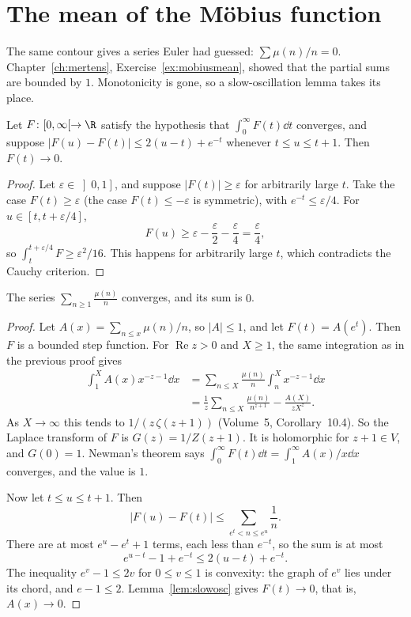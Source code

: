 \section{The mean of the Möbius function}

The same contour gives a series Euler had guessed: $\sum\mu(n)/n=0$. Chapter~\ref{ch:mertens}, Exercise~\ref{ex:mobiusmean}, showed that the partial sums are bounded by $1$. Monotonicity is gone, so a slow-oscillation lemma takes its place.

\begin{lemma}\label{lem:slowosc}
Let $F\colon[0,\infty[\to\R$ satisfy the hypothesis that $\int_0^\infty F(t)\dd t$ converges, and suppose $|F(u)-F(t)|\le2(u-t)+e^{-t}$ whenever $t\le u\le t+1$. Then $F(t)\to0$.
\end{lemma}
\begin{proof}
Let $\varepsilon\in\left]0,1\right]$, and suppose $|F(t)|\ge\varepsilon$ for arbitrarily large $t$. Take the case $F(t)\ge\varepsilon$ (the case $F(t)\le-\varepsilon$ is symmetric), with $e^{-t}\le\varepsilon/4$. For $u\in[t,t+\varepsilon/4]$,
\[
F(u)\ge\varepsilon-\frac\varepsilon2-\frac\varepsilon4=\frac\varepsilon4,
\]
so $\int_t^{t+\varepsilon/4}F\ge\varepsilon^2/16$. This happens for arbitrarily large $t$, which contradicts the Cauchy criterion.
\end{proof}

\begin{theorem}\label{thm:mobiussum}
The series $\sum_{n\ge1}\frac{\mu(n)}n$ converges, and its sum is $0$.
\end{theorem}
\begin{proof}
Let $A(x)=\sum_{n\le x}\mu(n)/n$, so $|A|\le1$, and let $F(t)=A(e^t)$. Then $F$ is a bounded step function. For $\operatorname{Re}z>0$ and $X\ge1$, the same integration as in the previous proof gives
\[
\begin{aligned}\int_1^XA(x)x^{-z-1}\dd x&=\sum_{n\le X}\frac{\mu(n)}n\int_n^Xx^{-z-1}\dd x\\&=\frac1z\sum_{n\le X}\frac{\mu(n)}{n^{z+1}}-\frac{A(X)}{zX^z}.\end{aligned}
\]
As $X\to\infty$ this tends to $1/(z\,\zeta(z+1))$ (Volume~5, Corollary~10.4). So the Laplace transform of $F$ is $G(z)=1/Z(z+1)$. It is holomorphic for $z+1\in V$, and $G(0)=1$. Newman's theorem says $\int_0^\infty F(t)\dd t=\int_1^\infty A(x)/x\dd x$ converges, and the value is $1$.

Now let $t\le u\le t+1$. Then
\[
|F(u)-F(t)|\le\sum_{e^t<n\le e^u}\frac1n.
\]
There are at most $e^u-e^t+1$ terms, each less than $e^{-t}$, so the sum is at most
\[
e^{u-t}-1+e^{-t}\le2(u-t)+e^{-t}.
\]
The inequality $e^v-1\le2v$ for $0\le v\le1$ is convexity: the graph of $e^v$ lies under its chord, and $e-1\le2$. Lemma~\ref{lem:slowosc} gives $F(t)\to0$, that is, $A(x)\to0$.
\end{proof}

